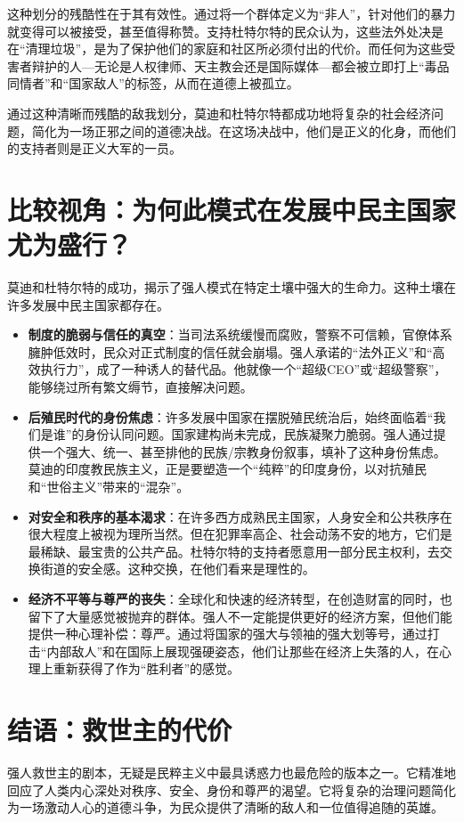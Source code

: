这种划分的残酷性在于其有效性。通过将一个群体定义为``非人''，针对他们的暴力就变得可以被接受，甚至值得称赞。支持杜特尔特的民众认为，这些法外处决是在``清理垃圾''，是为了保护他们的家庭和社区所必须付出的代价。而任何为这些受害者辩护的人---无论是人权律师、天主教会还是国际媒体---都会被立即打上``毒品同情者''和``国家敌人''的标签，从而在道德上被孤立。

通过这种清晰而残酷的敌我划分，莫迪和杜特尔特都成功地将复杂的社会经济问题，简化为一场正邪之间的道德决战。在这场决战中，他们是正义的化身，而他们的支持者则是正义大军的一员。

\section{比较视角：为何此模式在发展中民主国家尤为盛行？}
莫迪和杜特尔特的成功，揭示了强人模式在特定土壤中强大的生命力。这种土壤在许多发展中民主国家都存在。
\begin{itemize}
\item \textbf{制度的脆弱与信任的真空}：当司法系统缓慢而腐败，警察不可信赖，官僚体系臃肿低效时，民众对正式制度的信任就会崩塌。强人承诺的``法外正义''和``高效执行力''，成了一种诱人的替代品。他就像一个``超级CEO''或``超级警察''，能够绕过所有繁文缛节，直接解决问题。
\item \textbf{后殖民时代的身份焦虑}：许多发展中国家在摆脱殖民统治后，始终面临着``我们是谁''的身份认同问题。国家建构尚未完成，民族凝聚力脆弱。强人通过提供一个强大、统一、甚至排他的民族/宗教身份叙事，填补了这种身份焦虑。莫迪的印度教民族主义，正是要塑造一个``纯粹''的印度身份，以对抗殖民和``世俗主义''带来的``混杂''。
\item \textbf{对安全和秩序的基本渴求}：在许多西方成熟民主国家，人身安全和公共秩序在很大程度上被视为理所当然。但在犯罪率高企、社会动荡不安的地方，它们是最稀缺、最宝贵的公共产品。杜特尔特的支持者愿意用一部分民主权利，去交换街道的安全感。这种交换，在他们看来是理性的。
\item \textbf{经济不平等与尊严的丧失}：全球化和快速的经济转型，在创造财富的同时，也留下了大量感觉被抛弃的群体。强人不一定能提供更好的经济方案，但他们能提供一种心理补偿：尊严。通过将国家的强大与领袖的强大划等号，通过打击``内部敌人''和在国际上展现强硬姿态，他们让那些在经济上失落的人，在心理上重新获得了作为``胜利者''的感觉。
\end{itemize}

\section{结语：救世主的代价}
强人救世主的剧本，无疑是民粹主义中最具诱惑力也最危险的版本之一。它精准地回应了人类内心深处对秩序、安全、身份和尊严的渴望。它将复杂的治理问题简化为一场激动人心的道德斗争，为民众提供了清晰的敌人和一位值得追随的英雄。

